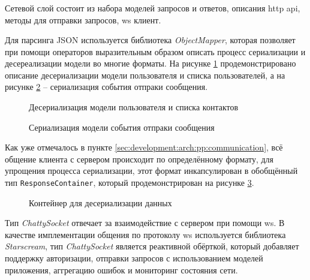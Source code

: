 \subsubsection{}
\label{sec:development:client:networking}

Сетевой слой состоит из набора моделей запросов и ответов, описания \gls{http} \gls{api}, методы для отправки запросов, \gls{ws} клиент.

Для парсинга JSON используется библиотека \textit{ObjectMapper}, которая позволяет при помощи операторов выразительным образом описать процесс сериализации и десереализации модели во многие форматы.
На рисунке \ref{sec:development:client:networking:code:deserialize} продемонстрировано описание десериализации модели пользователя и списка пользователей, а на рисунке \ref{sec:development:client:networking:code:serialize} -- сериализация события отпраки сообщения.

\begin{figure}[h]
	
   \caption{Десериализация модели пользователя и списка контактов}
   \label{sec:development:client:networking:code:deserialize}
\end{figure}

\begin{figure}[h]
	
   \caption{Сериализация модели события отпраки сообщения}
   \label{sec:development:client:networking:code:serialize}
\end{figure}

Как уже отмечалось в пункте \ref{sec:development:arch:pp:communication}, всё общение клиента с сервером происходит по определённому формату, для упрощения процесса сериализации, этот формат инкапсулирован в обобщённый тип \texttt{ResponseContainer}, который продемонстрирован на рисунке \ref{sec:development:client:networking:code:deserialize:container}.

\begin{figure}[h]
	
   \caption{Контейнер для десериализации данных}
   \label{sec:development:client:networking:code:deserialize:container}
\end{figure}

Тип \textit{ChattySocket} отвечает за взаимодействие с сервером при помощи \gls{ws}. В качестве имплементации общения по протоколу \gls{ws} используется библиотека \textit{Starscream}, тип \textit{ChattySocket} является реактивной обёрткой, который добавляет поддержку авторизации, отправки запросов с использованием моделей приложения, аггрегацию ошибок и мониторинг состояния сети.

